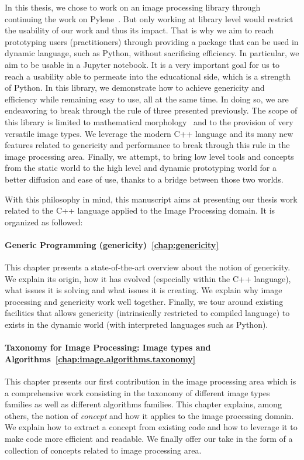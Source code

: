 In this thesis, we chose to work on an image processing library through continuing the work on
Pylene~\parencite{carlinet.2018.pylene}. But only working at library level would restrict the usability of our work and
thus its impact. That is why we aim to reach prototyping users (practitioners) through providing a package that can be
used in dynamic language, such as Python, without sacrificing efficiency. In particular, we aim to be usable in a
Jupyter notebook. It is a very important goal for us to reach a usability able to permeate into the educational side,
which is a strength of Python. In this library, we demonstrate how to achieve genericity and efficiency while remaining
easy to use, all at the same time. In doing so, we are endeavoring to break through the rule of three presented
previously. The scope of this library is limited to mathematical
morphology~\parencite{najman.2013.mathematical,geraud.2010.book} and to the provision of very versatile image types. We
leverage the modern C++ language and its many new features related to genericity and performance to break through this
rule in the image processing area. Finally, we attempt, to bring low level tools and concepts from the static world to
the high level and dynamic prototyping world for a better diffusion and ease of use, thanks to a bridge between those
two worlds.

With this philosophy in mind, this manuscript aims at presenting our thesis work related to the C++ language applied to
the Image Processing domain. It is organized as followed:

\paragraph{Generic Programming (genericity)~\ref{chap:genericity}} This chapter presents a state-of-the-art overview
about the notion of genericity. We explain its origin, how it has evolved (especially within the C++ language), what
issues it is solving and what issues it is creating. We explain why image processing and genericity work well together.
Finally, we tour around existing facilities that allows genericity (intrinsically restricted to compiled language) to
exists in the dynamic world (with interpreted languages such as Python).

\paragraph{Taxonomy for Image Processing: Image types and Algorithms~\ref{chap:image.algorithms.taxonomy}} This chapter
presents our first contribution in the image processing area which is a comprehensive work consisting in the taxonomy of
different image types families as well as different algorithms families. This chapter explains, among others, the notion
of \emph{concept} and how it applies to the image processing domain. We explain how to extract a concept from existing
code and how to leverage it to make code more efficient and readable. We finally offer our take in the form of a
collection of concepts related to image processing area.

